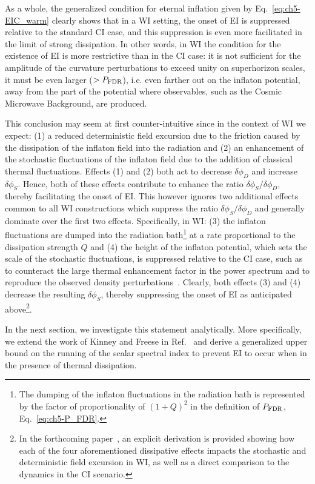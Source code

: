 As a whole, the generalized condition for eternal inflation given by
Eq.~\ref{eq:ch5-EIC_warm} clearly shows that in a WI setting, the onset of EI is suppressed relative to the standard CI case, and
this suppression is even more facilitated in the limit of strong dissipation. In other words, in WI the condition for the existence of EI is more restrictive than in the CI case: it is not sufficient for the amplitude of the curvature perturbations to exceed unity on superhorizon scales, it must be even larger ($>P_{\rm{FDR}}$), i.e. even farther
out on the inflaton potential, away from the part of the potential where observables, such as the Cosmic
Microwave Background, are produced.

This
conclusion may seem at first counter-intuitive since in the context of
WI we expect: (1) a reduced deterministic field excursion due to the
friction caused by the dissipation of the inflaton field into the
radiation and (2) an enhancement of the stochastic fluctuations of the
inflaton field due to the addition of classical thermal
fluctuations. Effects (1) and (2) both act to decrease
$\delta\phi_D$ and increase $\delta\phi_S$. Hence, both of these
effects contribute to enhance the ratio $\delta\phi_S/\delta\phi_D$,
thereby facilitating the onset of EI. This however ignores two
additional effects common to all WI constructions which suppress the
ratio $\delta\phi_S/\delta\phi_D$ and generally dominate over the
first two effects. Specifically, in WI: (3) the inflaton fluctuations
are dumped into the radiation bath\footnote{The dumping of the
inflaton fluctuations in the radiation bath is represented by the
factor of proportionality of $(1+Q)^2$ in the definition of
$P_{\rm{FDR}}$, Eq.~\ref{eq:ch5-P_FDR}. } at a rate proportional to the
dissipation strength $Q$ and (4) the height of the inflaton potential,
which sets the scale of the stochastic fluctuations, is suppressed
relative to the CI case, such as to counteract the large thermal
enhancement factor in the power spectrum and to reproduce the observed
density perturbations~\cite{Montefalcone:2022owy}. Clearly, both
effects (3) and (4) decrease the resulting $\delta\phi_S$, thereby
suppressing the onset of EI as anticipated above\footnote{In the
forthcoming paper~\cite{MRVFeistudy}, an explicit derivation is
provided showing how each of the four aforementioned dissipative
effects impacts the stochastic and deterministic field excursion in
WI, as well as a direct comparison to the dynamics in the CI
scenario.}.

In the next section, we investigate this statement analytically. More
specifically, we extend the work of Kinney and Freese in
Ref.~\cite{Kinney:2014jya} and derive a generalized upper bound on the
running of the scalar spectral index to prevent EI to occur when in
the presence of thermal dissipation.


